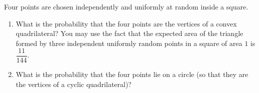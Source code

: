 Four points are chosen independently and uniformly at random inside a square.
\begin{enumerate}
\item[(a)] What is the probability that the four points are the vertices of a convex quadrilateral? You may use the fact that the expected area of the triangle formed by three independent uniformly random points in a square of area $1$ is $\dfrac{11}{144}$.
\item[(b)] What is the probability that the four points lie on a circle (so that they are the vertices of a cyclic quadrilateral)?
\end{enumerate}

